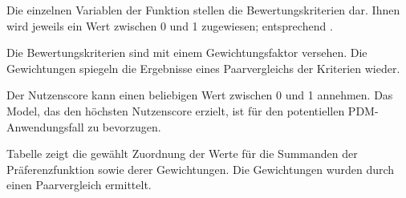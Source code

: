 Die einzelnen Variablen der Funktion stellen die Bewertungskriterien dar. Ihnen wird jeweils ein Wert zwischen 0 und 1 zugewiesen; entsprechend .

Die Bewertungskriterien sind mit einem Gewichtungsfaktor versehen. Die Gewichtungen spiegeln die Ergebnisse eines Paarvergleichs der Kriterien wieder. 

Der Nutzenscore kann einen beliebigen Wert zwischen 0 und 1 annehmen. Das Model, das den höchsten Nutzenscore erzielt, ist für den potentiellen PDM-Anwendungsfall zu bevorzugen.

Tabelle  zeigt die gewählt Zuordnung der Werte für die Summanden der Präferenzfunktion sowie derer Gewichtungen. Die Gewichtungen wurden durch einen Paarvergleich ermittelt.


